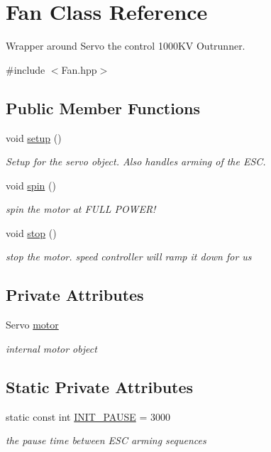 \hypertarget{classFan}{\section{Fan Class Reference}
\label{classFan}
}


Wrapper around Servo the control 1000\-K\-V Outrunner.  




{\ttfamily \#include $<$Fan.\-hpp$>$}

\subsection*{Public Member Functions}
\begin{DoxyCompactItemize}
\item 
void \hyperlink{classFan_afa6c28ec10c0f00270e04abc8344e220}{setup} ()
\begin{DoxyCompactList}\small\item\em Setup for the servo object. Also handles arming of the E\-S\-C. \end{DoxyCompactList}\item 
void \hyperlink{classFan_ab0574452a1e4ad34f668b4792be6021c}{spin} ()
\begin{DoxyCompactList}\small\item\em spin the motor at F\-U\-L\-L P\-O\-W\-E\-R! \end{DoxyCompactList}\item 
void \hyperlink{classFan_af4a96b6fd535b30f933a8bf8d1af50ff}{stop} ()
\begin{DoxyCompactList}\small\item\em stop the motor. speed controller will ramp it down for us \end{DoxyCompactList}\end{DoxyCompactItemize}
\subsection*{Private Attributes}
\begin{DoxyCompactItemize}
\item 
Servo \hyperlink{classFan_aff9de16d110a96ff5788f7d6ad6ef715}{motor}
\begin{DoxyCompactList}\small\item\em internal motor object \end{DoxyCompactList}\end{DoxyCompactItemize}
\subsection*{Static Private Attributes}
\begin{DoxyCompactItemize}
\item 
static const int \hyperlink{classFan_a8d7eb0f5de190ffc2f5d0ae1c5c10e29}{I\-N\-I\-T\-\_\-\-P\-A\-U\-S\-E} = 3000
\begin{DoxyCompactList}\small\item\em the pause time between E\-S\-C arming sequences \end{DoxyCompactList}\end{DoxyCompactItemize}


